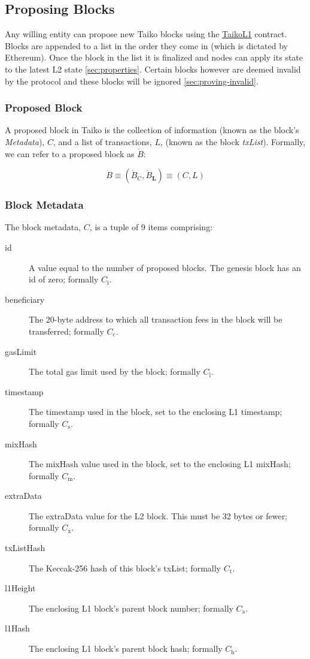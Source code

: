 \documentclass[9pt,oneside]{amsart}
\begin{document}
\begin{multicols}{2}
\subsection{Proposing Blocks}
Any willing entity can propose new Taiko blocks using the {\underline{TaikoL1}} contract. Blocks are appended to a list in the order they come in (which is dictated by Ethereum). Once the block in the list it is finalized and nodes can apply its state to the latest L2 state \ref{sec:properties}. Certain blocks however are deemed invalid by the protocol and these blocks will be ignored \ref{sec:proving-invalid}.

\subsubsection{Proposed Block} A proposed block in Taiko is the collection of information (known as the block's \emph{Metadata}), $C$, and a list of transactions, $L$,  (known as the block \emph{txList}). Formally, we can refer to a proposed block as $\dot{B}$:

\begin{equation}
\dot{B} \equiv (\dot{B}_{\mathrm{C}}, \dot{B}_{\mathbf{L}}) \equiv (C, L)
\end{equation}

\subsubsection{Block Metadata}\label{metadata} The block metadata, $C$, is a tuple of 9 items comprising:

\begin{description}
\item[id] A value equal to the number of proposed blocks. The genesis block has an id of zero; formally $C_{\mathrm{i}}$.
\item[beneficiary] The 20-byte address to which all transaction fees in the block will be transferred; formally $C_{\mathrm{c}}$.
\item[gasLimit] The total gas limit used by the block; formally $C_{\mathrm{l}}$.
\item[timestamp] The timestamp used in the block, set to the enclosing L1 timestamp; formally $C_{\mathrm{s}}$.
\item[mixHash] The mixHash value used in the block, set to the enclosing L1 mixHash; formally $C_{\mathrm{m}}$.
\item[extraData] The extraData value for the L2 block. This must be 32 bytes or fewer; formally $C_{\mathrm{x}}$.
\item[txListHash] The Keccak-256 hash of this block's txList; formally $C_{\mathrm{t}}$. 
\item[l1Height] The enclosing L1 block's parent block number; formally $C_{\mathrm{a}}$.
\item[l1Hash] The enclosing L1 block's parent block hash; formally $C_{\mathrm{h}}$.
\end{description}


\end{multicols}
\end{document}
